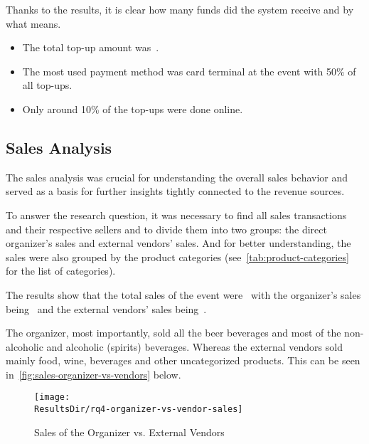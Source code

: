 Thanks to the results, it is clear how many funds did the system receive and by what means.

\begin{keytakeaways}
	\begin{itemize}
		\item The total top-up amount was~.
		\item The most used payment method was card terminal at the event with 50\% of all top-ups.
		\item Only around 10\% of the top-ups were done online.
	\end{itemize}
\end{keytakeaways}


\subsection{Sales Analysis}
\label{subsec:analysis-sales}

The sales analysis was crucial for understanding the overall sales behavior and served as a basis for further insights tightly connected to the revenue sources.

To answer the research question, it was necessary to find all sales transactions and their respective sellers and to divide them into two groups: the direct organizer's sales and external vendors' sales.
And for better understanding, the sales were also grouped by the product categories (see~\autoref{tab:product-categories} for the list of categories).

The results show that the total sales of the event were~ with the organizer's sales being~ and the external vendors' sales being~.

The organizer, most importantly, sold all the beer beverages and most of the non-alcoholic and alcoholic (spirits) beverages.
Whereas the external vendors sold mainly food, wine, beverages and other uncategorized products.
This can be seen in~\autoref{fig:sales-organizer-vs-vendors} below.

\begin{figure}[H]
	\centering
	\texttt{[image: \\ResultsDir/rq4-organizer-vs-vendor-sales]}
	\caption{Sales of the Organizer vs. External Vendors}
	\label{fig:sales-organizer-vs-vendors}
	\source
\end{figure}


